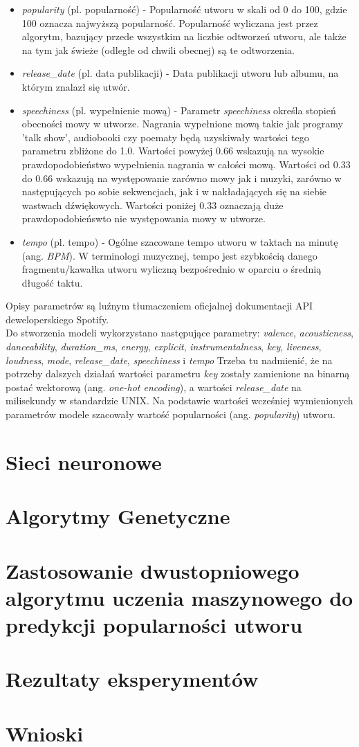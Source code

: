 \documentclass[a4paper,11pt]{article}
\begin{document}
\begin{itemize}
        \item \textit{popularity} (pl. popularność) - Popularność utworu w skali od 0 do 100, gdzie 100 oznacza najwyższą popularność. Popularność wyliczana jest przez algorytm, bazujący przede wszystkim na liczbie odtworzeń utworu, ale także na tym jak świeże (odległe od chwili obecnej) są te odtworzenia.
        \item \textit{release\_date} (pl. data publikacji) - Data publikacji utworu lub albumu, na którym znalazł się utwór.
        \item \textit{speechiness} (pl. wypełnienie mową) - Parametr \textit{speechiness} określa stopień obecności mowy w utworze. Nagrania wypełnione mową takie jak programy 'talk show', audiobooki czy poematy będą uzyskiwały wartości tego parametru zbliżone do 1.0. Wartości powyżej 0.66 wskazują na wysokie prawdopodobieństwo wypełnienia nagrania w całości mową. Wartości od 0.33 do 0.66 wskazują na występowanie zarówno mowy jak i muzyki, zarówno w następujących po sobie sekwencjach, jak i w nakładających się na siebie wastwach dźwiękowych. Wartości poniżej 0.33 oznaczają duże prawdopodobieńswto nie występowania mowy w utworze.
        \item \textit{tempo} (pl. tempo) - Ogólne szacowane tempo utworu w taktach na minutę (ang. \textit{BPM}). W terminologi muzycznej, tempo jest szybkością danego fragmentu/kawałka utworu wyliczną bezpośrednio w oparciu o średnią długość taktu.
    \end{itemize}
    Opisy parametrów są luźnym tłumaczeniem oficjalnej dokumentacji API deweloperskiego Spotify.
    \bigskip
    \\ Do stworzenia modeli wykorzystano następujące parametry: \textit{valence}, \textit{acousticness}, \textit{danceability}, \textit{duration\_ms}, \textit{energy}, \textit{explicit}, \textit{instrumentalness}, \textit{key}, \textit{liveness}, \textit{loudness}, \textit{mode}, \textit{release\_date}, \textit{speechiness} i \textit{tempo} Trzeba tu nadmienić, że na potrzeby dalszych działań wartości parametru \textit{key} zostały zamienione na binarną postać wektorową (ang. \textit{one-hot encoding}), a wartości \textit{release\_date} na milisekundy w standardzie UNIX. Na podstawie wartości wcześniej wymienionych parametrów modele szacowały wartość popularności (ang. \textit{popularity}) utworu.


    \section{Sieci neuronowe}


    \section{Algorytmy Genetyczne}


    \section{Zastosowanie dwustopniowego algorytmu uczenia maszynowego do predykcji popularności utworu}


    \section{Rezultaty eksperymentów}


    \section{Wnioski}
\end{document}
